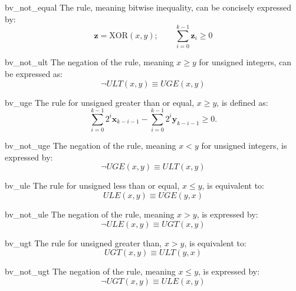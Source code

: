 \begin{RuleDescription}{bv_not_equal}
    The \currule{} rule, meaning bitwise inequality, can be concisely expressed by:
    \[
        \mathbf{z} = \text{XOR}(x, y); \qquad \sum_{i=0}^{k-1} \mathbf{z}_i \geq 0
    \]
\end{RuleDescription}

\begin{RuleDescription}{bv_not_ult}
    The negation of the \currule{} rule, meaning $x \geq y$ for unsigned integers, can be expressed as:
    \[
        \neg ULT(x, y) \equiv UGE(x, y)
    \]
\end{RuleDescription}

\begin{RuleDescription}{bv_uge}
    The \currule{} rule for unsigned greater than or equal, $x \geq y$, is defined as:
    \[
        \sum_{i=0}^{k-1} 2^i\mathbf{x}_{k-i-1} - \sum_{i=0}^{k-1} 2^i\mathbf{y}_{k-i-1} \geq 0.
    \]
\end{RuleDescription}

\begin{RuleDescription}{bv_not_uge}
    The negation of the \currule{} rule, meaning $x < y$ for unsigned integers, is expressed by:
    \[
        \neg UGE(x, y) \equiv ULT(x, y)
    \]
\end{RuleDescription}

\begin{RuleDescription}{bv_ule}
    The \currule{} rule for unsigned less than or equal, $x \leq y$, is equivalent to:
    \[
        ULE(x, y) \equiv UGE(y, x)
    \]
\end{RuleDescription}

\begin{RuleDescription}{bv_not_ule}
    The negation of the \currule{} rule, meaning $x > y$, is expressed by:
    \[
        \neg ULE(x, y) \equiv UGT(x, y)
    \]
\end{RuleDescription}

\begin{RuleDescription}{bv_ugt}
    The \currule{} rule for unsigned greater than, $x > y$, is equivalent to:
    \[
        UGT(x, y) \equiv ULT(y, x)
    \]
\end{RuleDescription}

\begin{RuleDescription}{bv_not_ugt}
    The negation of the \currule{} rule, meaning $x \leq y$, is expressed by:
    \[
        \neg UGT(x, y) \equiv ULE(x, y)
    \]
\end{RuleDescription}

